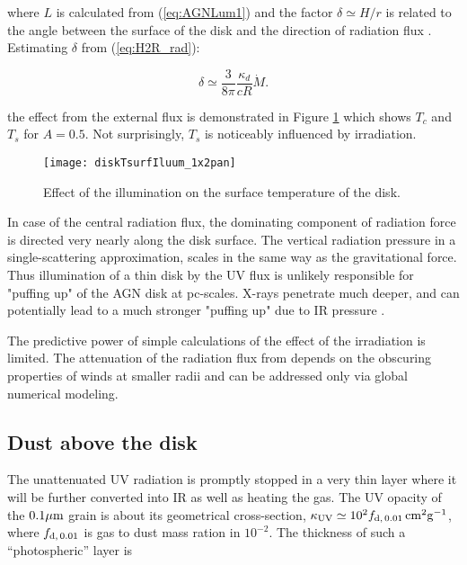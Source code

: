 \documentclass[12pt,english,preprint]{aastex}
\begin{document}
\noindent where $L$ is calculated from (\ref{eq:AGNLum1}) and the factor $\delta\simeq H/r$
is related to the angle between the surface of the disk and the direction
of radiation flux \citep{meyerVerticalStructureAccretion1982,Spruit96}.
Estimating $\delta$ from (\ref{eq:H2R_rad}):

\begin{equation}
\delta\simeq\frac{3}{8\pi}\frac{\kappa_{d}}{cR}\dot{M}\mbox{.}\label{eq:delt_illum}
\end{equation}

\noindent the effect from the external flux is demonstrated in Figure \ref{Fig:TcWithExtIrrad}
which shows $T_{c}$ and $T_{s}$ for $A=0.5$. Not surprisingly, $T_{s}$
is noticeably influenced by irradiation. 

\begin{figure}
\texttt{[image: diskTsurfIluum\_1x2pan]}\caption{Effect of the illumination on the surface temperature of the disk.}
\label{Fig:TcWithExtIrrad} 
\end{figure}


In case of the central radiation flux, the dominating component of radiation force is directed very 
nearly along the disk surface.  The vertical radiation pressure in a single-scattering approximation, scales in the same way as the gravitational
force. Thus illumination of a thin disk by the UV flux is unlikely responsible for "puffing up" of the AGN disk at pc-scales.
X-rays penetrate much deeper, and can 
potentially lead to a much stronger 
"puffing up" due to IR pressure \citep{Chang_etal07,Dorodnitsyn16}.


The predictive power of simple calculations of the effect of the irradiation
is limited. The attenuation of the radiation flux from depends on
the obscuring properties of winds at smaller radii and can be addressed
only via global numerical modeling.

\subsection{Dust above the disk}

The unattenuated UV radiation is promptly stopped in a very thin layer
where it will be further converted into IR as well as heating the
gas. The UV opacity of the $0.1{\rm \mu m}$ grain is about its geometrical
cross-section, $\kappa_{{\rm UV}}\simeq10^{2}f_{{\rm d,\,0.01}}\,{\rm cm^{2}g^{-1}}$,
where $f_{{\rm d,\,0.01}}$ is gas to dust mass ration in $10^{-2}$.
The thickness of such a ``photospheric'' layer is
\end{document}
